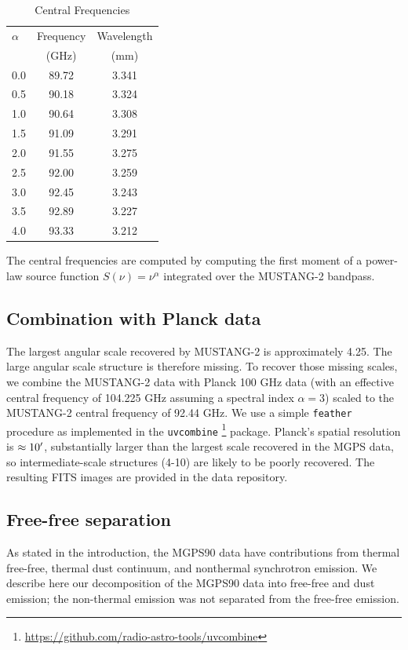 \documentclass[twocolumn]{aastex62}
\newcommand{\MUSTANG}{MUSTANG-2\xspace}
\begin{document}
\begin{table}[htp]
\centering
    \caption{Central Frequencies}
\begin{tabular}{lcc}
    \label{tab:centralfreq}
$\alpha$ & Frequency & Wavelength\\
         & (GHz)       & (mm) \\
\hline
0.0 & 89.72  & 3.341 \\
0.5 & 90.18  & 3.324 \\
1.0 & 90.64  & 3.308 \\
1.5 & 91.09  & 3.291 \\
2.0 & 91.55  & 3.275 \\
2.5 & 92.00  & 3.259 \\
3.0 & 92.45  & 3.243 \\
3.5 & 92.89  & 3.227 \\
4.0 & 93.33  & 3.212 \\
\hline
\end{tabular}
\par The central frequencies are computed by computing the first moment of a
power-law source function $S(\nu) = \nu^{\alpha}$ integrated over the \MUSTANG
bandpass.

\end{table}

\subsection{Combination with Planck data\label{sec:feather}}
The largest angular scale recovered by \MUSTANG is approximately 4.25\arcmin.
The large angular scale structure is therefore missing.  To recover those
missing scales, we combine the \MUSTANG data with
Planck 100 GHz data (with an effective central frequency of 104.225 GHz
assuming a spectral index $\alpha=3$) scaled to the \MUSTANG central frequency
of 92.44 GHz.  We use a simple \texttt{feather} procedure \citep{Cotton2017a}
as implemented in the \texttt{uvcombine}
\footnote{\url{https://github.com/radio-astro-tools/uvcombine}} package.
Planck's spatial resolution is $\approx10\mbox{$^\prime$}$, substantially larger
than the largest scale recovered in the MGPS data, so intermediate-scale
structures (4-10\arcmin) are likely to be poorly recovered.
The resulting FITS images are provided in the data repository.

\subsection{Free-free separation}
\label{sec:freefree}
As stated in the introduction,
the MGPS90
data have contributions from thermal free-free, thermal dust continuum, and
nonthermal synchrotron emission.  We describe here our decomposition of the
MGPS90 data into free-free and dust emission; the non-thermal emission was not
separated from the free-free emission.
\end{document}
